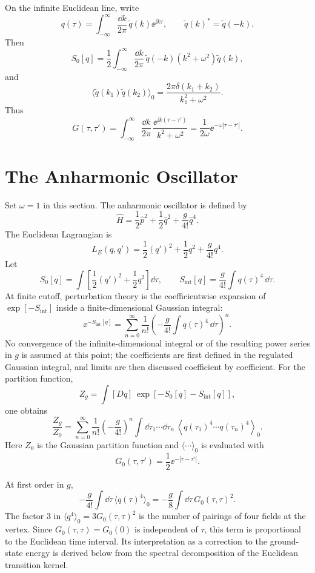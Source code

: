 On the infinite Euclidean line, write
\[
  q(\tau)=
  \int_{-\infty}^{\infty}\frac{\dd k}{2\pi}\,
  \widetilde q(k)\ee^{\ii k\tau},
  \qquad
  \widetilde q(k)^*=\widetilde q(-k).
\]
Then
\[
  S_0[q]
  =
  \frac12
  \int_{-\infty}^{\infty}\frac{\dd k}{2\pi}\,
  \widetilde q(-k)(k^2+\omega^2)\widetilde q(k),
\]
and
\[
  \langle \widetilde q(k_1)\widetilde q(k_2)\rangle_0
  =
  \frac{2\pi\delta(k_1+k_2)}{k_1^2+\omega^2}.
\]
Thus
\[
  G(\tau,\tau')
  =
  \int_{-\infty}^{\infty}
  \frac{\dd k}{2\pi}\,
  \frac{\ee^{\ii k(\tau-\tau')}}{k^2+\omega^2}
  =
  \frac{1}{2\omega}\ee^{-\omega|\tau-\tau'|}.
\]

\section{The Anharmonic Oscillator}

Set \(\omega=1\) in this section. The anharmonic oscillator is defined by
\[
  \widehat H
  =
  \frac12\widehat p^2+\frac12\widehat q^2+\frac{g}{4!}\widehat q^4.
\]
The Euclidean Lagrangian is
\[
  L_E(q,q')
  =
  \frac12(q')^2+\frac12q^2+\frac{g}{4!}q^4.
\]
Let
\[
  S_0[q]=\int\left[\frac12(q')^2+\frac12q^2\right]\dd\tau,
  \qquad
  S_{\mathrm{int}}[q]=\frac{g}{4!}\int q(\tau)^4\,\dd\tau .
\]
At finite cutoff, perturbation theory is the coefficientwise expansion of
\(\exp[-S_{\mathrm{int}}]\) inside a finite-dimensional Gaussian integral:
\[
  \ee^{-S_{\mathrm{int}}[q]}
  =
  \sum_{n=0}^{\infty}
  \frac{1}{n!}
  \left(-\frac{g}{4!}\int q(\tau)^4\,\dd\tau\right)^n .
\]
No convergence of the infinite-dimensional integral or of the resulting power
series in \(g\) is assumed at this point; the coefficients are first defined in
the regulated Gaussian integral, and limits are then discussed coefficient by
coefficient.
For the partition function,
\[
  Z_g=\int[Dq]\,\exp[-S_0[q]-S_{\mathrm{int}}[q]],
\]
one obtains
\[
  \frac{Z_g}{Z_0}
  =
  \sum_{n=0}^{\infty}
  \frac{1}{n!}
  \left(-\frac{g}{4!}\right)^n
  \int \dd\tau_1\cdots\dd\tau_n\,
  \left\langle
    q(\tau_1)^4\cdots q(\tau_n)^4
  \right\rangle_0 .
\]
Here \(Z_0\) is the Gaussian partition function and
\(\langle\cdots\rangle_0\) is evaluated with
\[
  G_0(\tau,\tau')=\frac12\ee^{-|\tau-\tau'|}.
\]

At first order in \(g\),
\[
  -\frac{g}{4!}\int\dd\tau\,\langle q(\tau)^4\rangle_0
  =
  -\frac{g}{8}\int\dd\tau\,G_0(\tau,\tau)^2.
\]
The factor \(3\) in \(\langle q^4\rangle_0=3G_0(\tau,\tau)^2\) is the number
of pairings of four fields at the vertex.
Since \(G_0(\tau,\tau)=G_0(0)\) is independent of \(\tau\), this term is
proportional to the Euclidean time interval.  Its interpretation as a correction
to the ground-state energy is derived below from the spectral decomposition of
the Euclidean transition kernel.

